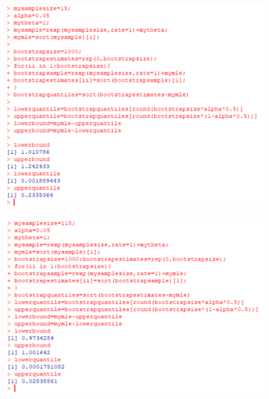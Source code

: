 \documentclass[UTF8]{report}
\theoremstyle{MyLineTheoremStyle} %
\theoremstyle{MyBlockTheoremStyle} %
\theoremstyle{MySubsubsectionStyle} %
\begin{document}
\begin{figure}[H]
    \centering
    \includegraphics[width=1\textwidth]{2024.11.6_1.png}
\end{figure}

\begin{figure}[H]
    \centering
    \includegraphics[width=1\textwidth]{2024.11.6_2.png}
\end{figure}
\end{document}
